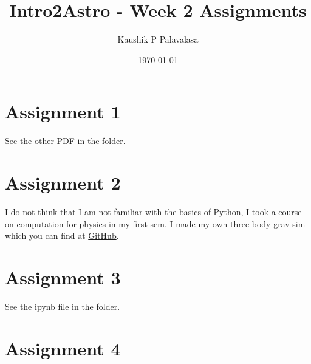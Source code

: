 \documentclass[floatfix, aps]{revtex4-2}
\begin{document}
	\title{Intro2Astro - Week 2 Assignments}
	\author{Kaushik P Palavalasa}
	\date{\today}

	\maketitle

\section{Assignment 1} 

See the other PDF in the folder. 

\section{Assignment 2}

I do not think that I am not familiar with the basics of Python, I took a course on computation for physics in my first sem. I made my own three body grav sim which you can find at \href{https://github.com/kapa2006/ComputationforPhysics}{GitHub}.

\section{Assignment 3}

See the ipynb file in the folder.

\section{Assignment 4}
\end{document}
